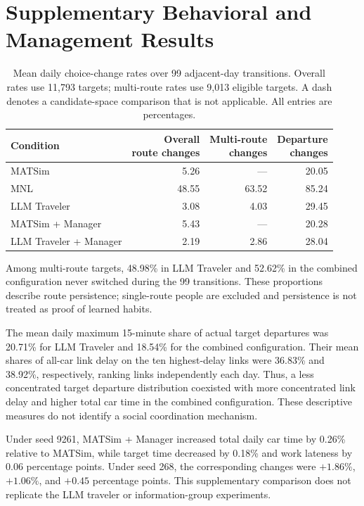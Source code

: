 \section{Supplementary Behavioral and Management Results}
\label{app:supplementary}

\begin{table}[htbp]
\centering\small
\caption{Mean daily choice-change rates over 99 adjacent-day transitions. Overall rates use 11,793 targets; multi-route rates use 9,013 eligible targets. A dash denotes a candidate-space comparison that is not applicable. All entries are percentages.}
\label{tab:supp-switching}
\begin{tabularx}{\linewidth}{@{}Xrrr@{}}
\toprule
Condition & \shortstack{Overall\\route changes} & \shortstack{Multi-route\\changes} & \shortstack{Departure\\changes} \\
\midrule
MATSim & 5.26 & --- & 20.05 \\
MNL & 48.55 & 63.52 & 85.24 \\
LLM Traveler & 3.08 & 4.03 & 29.45 \\
MATSim + Manager & 5.43 & --- & 20.28 \\
LLM Traveler + Manager & 2.19 & 2.86 & 28.04 \\
\bottomrule
\end{tabularx}
\end{table}

Among multi-route targets, 48.98\% in LLM Traveler and 52.62\% in the combined configuration never switched during the 99 transitions. These proportions describe route persistence; single-route people are excluded and persistence is not treated as proof of learned habits.

The mean daily maximum 15-minute share of actual target departures was 20.71\% for LLM Traveler and 18.54\% for the combined configuration. Their mean shares of all-car link delay on the ten highest-delay links were 36.83\% and 38.92\%, respectively, ranking links independently each day. Thus, a less concentrated target departure distribution coexisted with more concentrated link delay and higher total car time in the combined configuration. These descriptive measures do not identify a social coordination mechanism.

Under seed 9261, MATSim + Manager increased total daily car time by 0.26\% relative to MATSim, while target time decreased by 0.18\% and work lateness by 0.06 percentage points. Under seed 268, the corresponding changes were $+1.86\%$, $+1.06\%$, and $+0.45$ percentage points. This supplementary comparison does not replicate the LLM traveler or information-group experiments.


